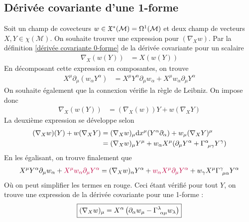 \subsection{Dérivée covariante d'une 1-forme}
Soit un champ de covecteurs $w \in \mathfrak{X}^*(\mathcal{M}) = \Omega^1(\mathcal{M})$ et deux champ de vecteurs $X, Y \in \chi(\mathcal{M})$. On souhaite trouver une expression pour $(\nabla_X w)$. Par la définition \ref{dérivée covariante 0-forme} de la dérivée covariante pour un scalaire 
\begin{align}
    \nabla_X(w(Y)) &= X(w(Y))
\end{align}
En décomposant cette expression en composantes, on trouve
\begin{align}
    X^{\mu}\partial_{\mu}(w_{\alpha} Y^{\alpha})&= X^{\mu}Y^{\alpha}\partial_{\mu}w_{\alpha} + X^{\mu}w_{\alpha}\partial_{\mu}Y^{\alpha}
    \label{dérivée covarantes 1-forme 2}
\end{align}
On souhaite également que la connexion vérifie la règle de Leibniz. On impose donc 
\begin{align}           
    \nabla_X(w(Y))&= (\nabla_X(w))Y + w(\nabla_X Y)
\end{align}
La deuxième expression se développe selon
\begin{align}
    (\nabla_X w)(Y) + w(\nabla_X Y) &= (\nabla_X w)_{\mu}\td x^{\mu}(Y^{\alpha}\partial_{\alpha}) +  w_\mu (\nabla_X Y)^\mu\\
    & = (\nabla_X w)_{\mu}Y^{\mu} + w_{\alpha}X^{\mu} (\partial_{\mu}Y^{\alpha} + \Gamma\indices{^{\alpha}_{\!\mu \gamma}}Y^{\gamma})
\end{align}
En les égalisant, on trouve finalement que
\begin{align}
    X^{\mu}Y^{\alpha}\partial_{\mu}w_{\alpha} + \textcolor{purple}{X^{\mu}w_{\alpha}\partial_{\mu}Y^{\alpha}} = (\nabla_X w)_{\alpha}Y^{\alpha} + \textcolor{purple}{w_{\alpha}X^{\mu}\partial_{\mu}Y^{\alpha}} + w_{\gamma}X^{\mu}\Gamma\indices{^{\gamma}_{\!\mu \alpha}}Y^{\alpha}
\end{align}    
Où on peut simplifier les termes en rouge. Ceci étant vérifié pour tout $Y$, on trouve une expression de la dérivée covariante pour une 1-forme :
\begin{equation}
    \boxed{(\nabla_X w)_{\mu} = X^{\alpha} \lt \partial_{\alpha}w_{\mu} - \Gamma\indices{^{\lambda}_{\!\alpha \mu}}w_{\lambda} \rt}
    \label{dérivée covariance 1-forme egalisé 1}
\end{equation}
